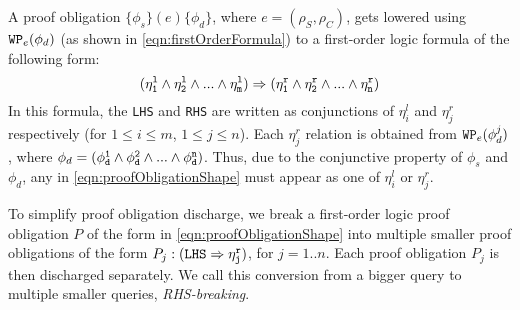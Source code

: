 A proof obligation
$\{\phi_s\}(e)\{\phi_d\}$, where $e=(\rho_S,\rho_C)$,
gets lowered using
${\tt WP}_{e}(\phi_d)$ (as shown in \cref{eqn:firstOrderFormula}) to a first-order logic formula of the following form:
\begin{equation}\label{eqn:proofObligationShape}
({\tt \eta^{l}_1 \land \eta^{l}_2 \land ... \land \eta^{l}_m}) \Rightarrow ({\tt \eta^{r}_1 \land \eta^{r}_2 \land ... \land \eta^{r}_n})
\end{equation}
In
this formula,
the {\tt LHS} and {\tt RHS} are
written as conjunctions of $\eta^{l}_i$ and $\eta^{r}_j$ respectively (for $1\leq i\leq m$, $1\leq j\leq n$).
Each $\eta^{r}_j$ relation is obtained from
${\tt WP}_{e}(\phi^{j}_d)$, where $\phi_d=({\tt \phi^{1}_d \land \phi^{2}_d \land ... \land \phi^{n}_d})$.
Thus, due to the conjunctive \recursiveRelation{} property of $\phi_s$ and $\phi_d$, any
\recursiveRelation{} in \cref{eqn:proofObligationShape} must appear as
one of $\eta^{l}_i$ or $\eta^{r}_j$.

To simplify proof obligation discharge,
we break a first-order logic proof obligation $P$ of the form in \cref{eqn:proofObligationShape}
into multiple smaller proof obligations
of the form
$P_j:({\tt LHS}\Rightarrow{\tt \eta^{r}_j})$, for $j=1..n$. Each proof obligation
$P_j$ is then discharged separately.  We call this conversion from
a bigger query to multiple smaller queries, {\em RHS-breaking}.

%


